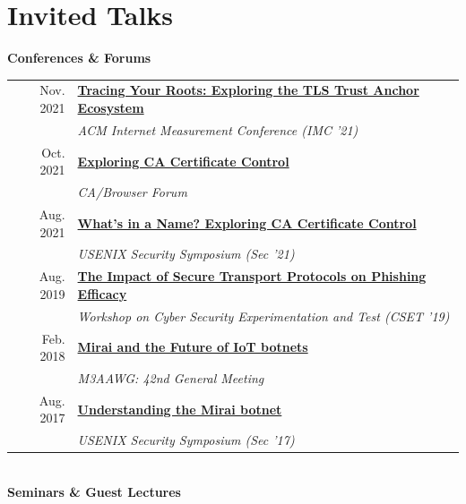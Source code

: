 \documentclass[10pt,singlecolumn]{article} %
\begin{document}
\section{Invited Talks} 

\textbf{Conferences \& Forums}\\

\begin{tabular}{rl}
Nov. 2021 & \textbf{\href{https://zanema.com/videos/imc21-roots.mp4}{Tracing Your Roots: Exploring the TLS Trust Anchor Ecosystem}}\\
& \emph{ACM Internet Measurement Conference (IMC '21)} \\
Oct. 2021 & \textbf{\href{https://zanema.com/slides/cab_forum_ca_transparency.pdf}{Exploring CA Certificate Control}}\\
& \emph{CA/Browser Forum} \\
Aug. 2021 & \textbf{\href{https://www.youtube.com/watch?v=Aq1o8prmoyE}{What's in a Name? Exploring CA Certificate Control}} \\
& \emph{USENIX Security Symposium (Sec '21)} \\
Aug. 2019 & \textbf{\href{https://zanema.com/slides/cset-https-phishing-2019.pdf}{The Impact of Secure Transport Protocols on Phishing Efficacy}} \\
& \emph{Workshop on Cyber Security Experimentation and Test (CSET '19)} \\
Feb. 2018 & \textbf{\href{https://zanema.com/slides/m3aawg_mirai.pdf}{Mirai and the Future of IoT botnets}}\\
& \emph{M3AAWG: 42nd General Meeting} \\ 
Aug. 2017 & \textbf{\href{https://www.youtube.com/watch?v=1pywzRTJDaY}{Understanding the Mirai botnet}} \\
& \emph{USENIX Security Symposium (Sec '17)} \\ 
\end{tabular} \\

\vspace{0.3cm}
\textbf{Seminars \& Guest Lectures}\\
\end{document}
